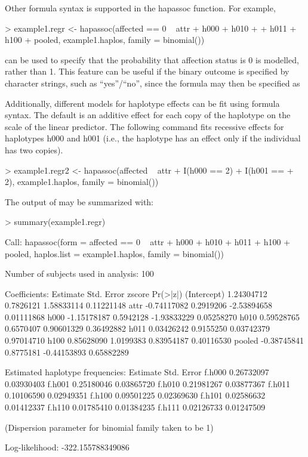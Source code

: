 \documentclass[article, shortnames]{jss}
\begin{document}
Other formula syntax is supported in the hapassoc function.
For example,
\begin{Schunk}
\begin{Sinput}
> example1.regr <- hapassoc(affected == 0 ~ attr + h000 + h010 + 
+     h011 + h100 + pooled, example1.haplos, family = binomial())
\end{Sinput}
\end{Schunk}
can be used to specify that the probability that affection status is 0 is
modelled, rather than 1. This feature can be useful if the binary outcome 
is specified by character strings, such as ``yes''/``no'', since the 
formula may then be specified as 

Additionally, different models for haplotype effects can be fit using
 formula syntax. The default is an additive effect for each 
copy of the haplotype on the scale of the linear predictor. The following 
command fits recessive effects for haplotypes h000 and h001 
(i.e., the haplotype has an effect only if the individual has two copies).
\begin{Schunk}
\begin{Sinput}
> example1.regr2 <- hapassoc(affected ~ attr + I(h000 == 2) + I(h001 == 
+     2), example1.haplos, family = binomial())
\end{Sinput}
\end{Schunk}
The output of  may be summarized with:
\begin{Schunk}
\begin{Sinput}
> summary(example1.regr)
\end{Sinput}
\begin{Soutput}
Call:
hapassoc(form = affected == 0 ~ attr + h000 + h010 + h011 + h100 + 
    pooled, haplos.list = example1.haplos, family = binomial())

Number of subjects used in analysis: 100 

Coefficients:
               Estimate Std. Error      zscore   Pr(>|z|)
(Intercept)  1.24304712  0.7826121  1.58833114 0.11221148
attr        -0.74117082  0.2919206 -2.53894658 0.01111868
h000        -1.15178187  0.5942128 -1.93833229 0.05258270
h010         0.59528765  0.6570407  0.90601329 0.36492882
h011         0.03426242  0.9155250  0.03742379 0.97014710
h100         0.85628090  1.0199383  0.83954187 0.40116530
pooled      -0.38745841  0.8775181 -0.44153893 0.65882289

Estimated haplotype frequencies:
         Estimate Std. Error
f.h000 0.26732097 0.03930403
f.h001 0.25180046 0.03865720
f.h010 0.21981267 0.03877367
f.h011 0.10106590 0.02949351
f.h100 0.09501225 0.02369630
f.h101 0.02586632 0.01412337
f.h110 0.01785410 0.01384235
f.h111 0.02126733 0.01247509

(Dispersion parameter for binomial family taken to be 1)

Log-likelihood: -322.155788349086 
\end{Soutput}
\end{Schunk}
\end{document}
